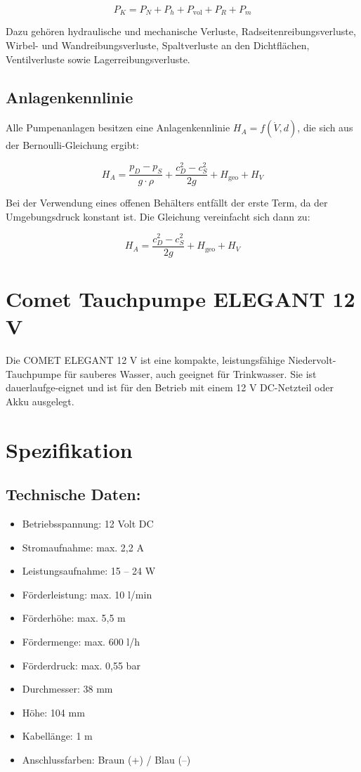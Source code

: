 \begin{equation}
	P_K = P_N + P_h + P_{\text{vol}} + P_R + P_m
\end{equation}

Dazu gehören hydraulische und mechanische Verluste, Radseitenreibungsverluste, Wirbel- und Wandreibungsverluste, Spaltverluste an den Dichtflächen, Ventilverluste sowie Lagerreibungsverluste.

\subsection{Anlagenkennlinie}

Alle Pumpenanlagen besitzen eine Anlagenkennlinie \( H_A = f(\dot{V}, d) \), die sich aus der Bernoulli-Gleichung ergibt:

\begin{equation}
	H_A = \frac{p_D - p_S}{g \cdot \rho} + \frac{c_D^2 - c_S^2}{2g} + H_{\text{geo}} + H_V
\end{equation}

Bei der Verwendung eines offenen Behälters entfällt der erste Term, da der Umgebungsdruck konstant ist. Die Gleichung vereinfacht sich dann zu:

\begin{equation}
	H_A = \frac{c_D^2 - c_S^2}{2g} + H_{\text{geo}} + H_V
\end{equation}
\cite{Surek:2021}

\section{Comet Tauchpumpe ELEGANT 12 V}
Die COMET ELEGANT 12 V ist eine kompakte, leistungsfähige Niedervolt-Tauchpumpe für sauberes Wasser, auch geeignet für Trinkwasser. Sie ist dauerlaufge-eignet und ist für den Betrieb mit einem 12 V DC-Netzteil oder Akku ausgelegt. \cite{Comet:2004} \cite{ConradPumpe:2025}

\section{Spezifikation}
\subsection{Technische Daten:}
\begin{itemize}
	\item Betriebsspannung: 12 Volt DC
	\item Stromaufnahme: max. 2,2 A
	\item Leistungsaufnahme: 15 – 24 W
	\item Förderleistung: max. 10 l/min
	\item Förderhöhe: max. 5,5 m
	\item Fördermenge: max. 600 l/h
	\item Förderdruck: max. 0,55 bar 
	\item Durchmesser: 38 mm
	\item Höhe: 104 mm
	\item Kabellänge: 1 m
	\item Anschlussfarben: Braun (+) / Blau (–)
\end{itemize}
